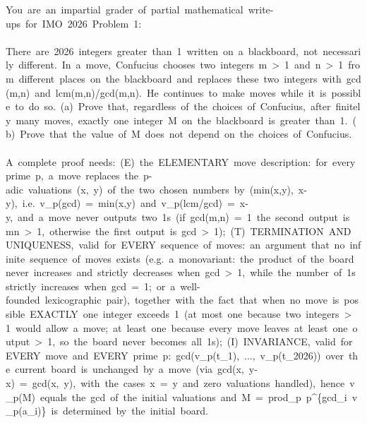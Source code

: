 \begin{flushleft}\ttfamily\scriptsize{}
{}You\ are\ an\ impartial\ grader\ of\ partial\ mathematical\ write-{}ups\ for\ IMO\ 2026\ Problem\ 1:\\
\mbox{}\\
{}\textquotedbl{}There\ are\ 2026\ integers\ greater\ than\ 1\ written\ on\ a\ blackboard,\ not\ necessarily\ different.\ In\ a\ move,\ Confucius\ chooses\ two\ integers\ m\ \textgreater{}\ 1\ and\ n\ \textgreater{}\ 1\ from\ different\ places\ on\ the\ blackboard\ and\ replaces\ these\ two\ integers\ with\ gcd(m,n)\ and\ lcm(m,n)/gcd(m,n).\ He\ continues\ to\ make\ moves\ while\ it\ is\ possible\ to\ do\ so.\ (a)\ Prove\ that,\ regardless\ of\ the\ choices\ of\ Confucius,\ after\ finitely\ many\ moves,\ exactly\ one\ integer\ M\ on\ the\ blackboard\ is\ greater\ than\ 1.\ (b)\ Prove\ that\ the\ value\ of\ M\ does\ not\ depend\ on\ the\ choices\ of\ Confucius.\textquotedbl{}\\
\mbox{}\\
{}A\ complete\ proof\ needs:\ (E)\ the\ ELEMENTARY\ move\ description:\ for\ every\ prime\ p,\ a\ move\ replaces\ the\ p-{}adic\ valuations\ (x,\ y)\ of\ the\ two\ chosen\ numbers\ by\ (min(x,y),\ \textbar{}x-{}y\textbar{}),\ i.e.\ v\_p(gcd)\ =\ min(x,y)\ and\ v\_p(lcm/gcd)\ =\ \textbar{}x-{}y\textbar{},\ and\ a\ move\ never\ outputs\ two\ 1s\ (if\ gcd(m,n)\ =\ 1\ the\ second\ output\ is\ mn\ \textgreater{}\ 1,\ otherwise\ the\ first\ output\ is\ gcd\ \textgreater{}\ 1);\ (T)\ TERMINATION\ AND\ UNIQUENESS,\ valid\ for\ EVERY\ sequence\ of\ moves:\ an\ argument\ that\ no\ infinite\ sequence\ of\ moves\ exists\ (e.g.\ a\ monovariant:\ the\ product\ of\ the\ board\ never\ increases\ and\ strictly\ decreases\ when\ gcd\ \textgreater{}\ 1,\ while\ the\ number\ of\ 1s\ strictly\ increases\ when\ gcd\ =\ 1;\ or\ a\ well-{}founded\ lexicographic\ pair),\ together\ with\ the\ fact\ that\ when\ no\ move\ is\ possible\ EXACTLY\ one\ integer\ exceeds\ 1\ (at\ most\ one\ because\ two\ integers\ \textgreater{}\ 1\ would\ allow\ a\ move;\ at\ least\ one\ because\ every\ move\ leaves\ at\ least\ one\ output\ \textgreater{}\ 1,\ so\ the\ board\ never\ becomes\ all\ 1s);\ (I)\ INVARIANCE,\ valid\ for\ EVERY\ move\ and\ EVERY\ prime\ p:\ gcd(v\_p(t\_1),\ ...,\ v\_p(t\_2026))\ over\ the\ current\ board\ is\ unchanged\ by\ a\ move\ (via\ gcd(x,\ y-{}x)\ =\ gcd(x,\ y),\ with\ the\ cases\ x\ =\ y\ and\ zero\ valuations\ handled),\ hence\ v\_p(M)\ equals\ the\ gcd\ of\ the\ initial\ valuations\ and\ M\ =\ prod\_p\ p\^{}\{gcd\_i\ v\_p(a\_i)\}\ is\ determined\ by\ the\ initial\ board.\\

\end{flushleft}
